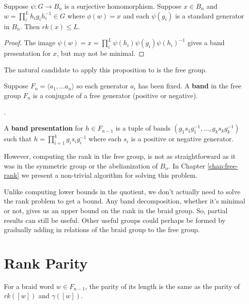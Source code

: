 \documentclass[12pt]{thesis}
\begin{document}
\begin{proposition}
    \label{prop:upper-bounds-from-quotient}
Suppose $\psi \colon G \rightarrow B_{n}$
is a surjective homomorphism.
    Suppose $x \in B_{n}$ and $w = \prod_{i}^{L} h_{i}g_{i}h_{i}^{-1} \in G$
    where $\phi(w) = x$
    and each $\psi(g_{i})$ is a standard
    generator in $B_{n}$. 
    Then $rk(x) \leq L$.
\end{proposition}
\begin{proof}
    The image $\psi(w) = x = \prod_{i}^{L} \psi(h_{i}) \psi(g_{i}) \psi(h_{i})^{-1}$
    gives a band presentation for $x$, but may not be minimal.
\end{proof}

The natural candidate to apply this proposition to is the free group.
\begin{definition}
    Suppose $F_{n} = \langle a_{1}, \ldots a_{n} \rangle$
    so each generator $a_{i}$ has been fixed.
    A \textbf{band} in the free group $F_{n}$ is a conjugate
    of a free generator (positive or negative).
\end{definition}.
\begin{definition}
    A \textbf{band presentation} for $h \in F_{n-1}$ is a 
    tuple of bands $(g_{1}s_{1}g_{1}^{-1}, \ldots, g_{k}s_{k}g_{k}^{-1})$
    such that $h = \prod_{i=1}^{k} g_{i}s_{i}g_{i}^{-1}$
    where each $s_{i}$ is a positive or negative generator.
\end{definition}

However, computing the rank in the free group, is not as straightforward
as it was in the symmetric group or the abelianization of $B_{n}$.
In Chapter \ref{chap:free-rank} we
present a non-trivial algorithm for solving this problem.

Unlike computing lower bounds in the quotient,
we don't actually need to solve the rank problem to get a bound.
Any band decomposition, whether it's minimal or not, gives
us an upper bound on the rank in the braid group.
So, partial results can still be useful.
Other useful groups could perhaps be
formed by gradually adding in relations of the braid group 
to the free group.

\section{Rank Parity}

\begin{corollary}
    \label{cor:rank-parity}
    For a braid word $w \in F_{n-1}$,
    the parity of its length
    is the same as the parity of $rk([w])$ and $\gamma([w])$.
\end{corollary}
\end{document}
